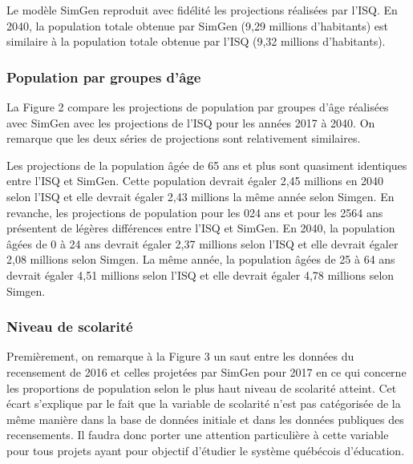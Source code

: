 \documentclass[letterpaper,10pt,french]{sphinxmanual}
\begin{document}
Le modèle SimGen reproduit avec fidélité les projections réalisées par l’ISQ. En 2040, la population totale obtenue par SimGen (9,29 millions d’habitants) est similaire à la population totale obtenue par l’ISQ (9,32 millions d’habitants).


\subsubsection{Population par groupes d’âge}
\label{\detokenize{resultats:population-par-groupes-d-age}}
\begin{figure}[htbp]
\centering

\noindent{}
\end{figure}

La Figure 2 compare les projections de population par groupes d’âge réalisées avec SimGen avec les projections de l’ISQ pour les années 2017 à 2040.
On remarque que les deux séries de projections sont relativement similaires.

Les projections de la population âgée de 65 ans et plus sont quasiment identiques entre l’ISQ et SimGen.
Cette population devrait égaler 2,45 millions en 2040 selon l’ISQ et elle devrait égaler 2,43 millions la même année selon Simgen.
En revanche, les projections de population pour les 0\sphinxhyphen{}24 ans  et pour les 25\sphinxhyphen{}64 ans présentent de légères différences entre l’ISQ et SimGen.
En 2040, la population âgées de 0 à 24 ans devrait égaler 2,37 millions selon l’ISQ et elle devrait égaler 2,08 millions selon Simgen.
La même année, la population âgées de 25 à 64 ans devrait égaler 4,51 millions selon l’ISQ et elle devrait égaler 4,78 millions selon Simgen.


\subsubsection{Niveau de scolarité}
\label{\detokenize{resultats:niveau-de-scolarite}}
\begin{figure}[htbp]
\centering

\noindent{}
\end{figure}

Premièrement, on remarque à la Figure 3 un saut entre les données du recensement de 2016 et celles projetées par SimGen pour 2017 en ce qui concerne les proportions de population selon le plus haut niveau de scolarité atteint. Cet écart s’explique par le fait que la variable de scolarité n’est pas catégorisée de la même manière dans la base de données initiale et dans les données publiques des recensements. Il faudra donc porter une attention particulière à cette variable pour tous projets ayant pour objectif d’étudier le système québécois d’éducation.
\end{document}
